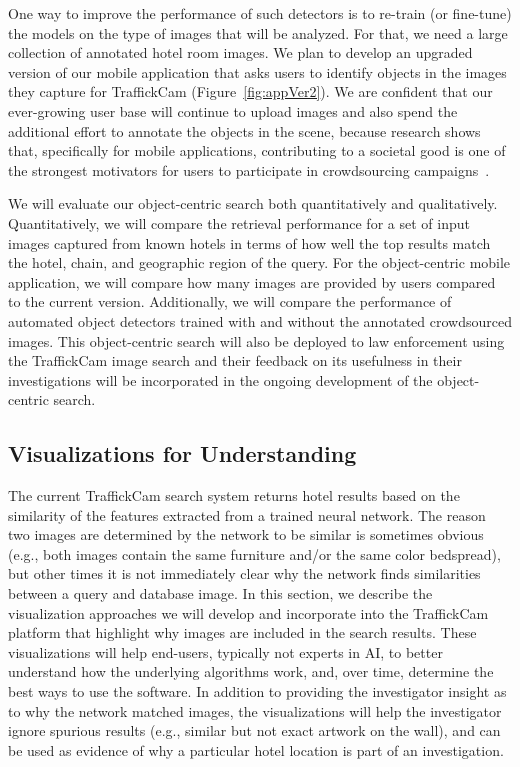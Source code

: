 \documentclass[12pt]{article}
\begin{document}
One way to improve the performance of such detectors is to re-train (or fine-tune) the models on the type of images that will be analyzed. For that, we need a large collection of annotated hotel room images. We plan to develop an upgraded version of our mobile application that asks users to identify objects in the images they capture for TraffickCam (Figure~\ref{fig:appVer2}). We are confident that our ever-growing user base will continue to upload images and also spend the additional effort to annotate the objects in the scene, because research shows that, specifically for mobile applications, contributing to a societal good is one of the strongest motivators for users to participate in crowdsourcing campaigns~\cite{DBLP:journals/tosn/RestucciaDP16}.

We will evaluate our object-centric search both quantitatively and qualitatively. Quantitatively, we will compare the retrieval performance for a set of input images captured from known hotels in terms of how well the top results match the hotel, chain, and geographic region of the query. For the object-centric mobile application, we will compare how many images are provided by users compared to the current version. Additionally, we will compare the performance of automated object detectors trained with and without the annotated crowdsourced images. This object-centric search will also be deployed to law enforcement using the TraffickCam image search and their feedback on its usefulness in their investigations will be incorporated in the ongoing development of the object-centric search.

\subsection{Visualizations for Understanding}
\label{sec:viz}
The current TraffickCam search system returns hotel results based on the similarity of the features extracted from a trained neural network. The reason two images are determined by the network to be similar is sometimes obvious (e.g., both images contain the same furniture and/or the same color bedspread), but other times it is not immediately clear why the network finds similarities between a query and database image. In this section, we describe the visualization approaches we will develop and incorporate into the TraffickCam platform that highlight why images are included in the search results. These visualizations will help end-users, typically not experts in AI, to better understand how the underlying algorithms work, and, over time, determine the best ways to use the software. In addition to providing the investigator insight as to why the network matched images, the visualizations will help the investigator ignore spurious results (e.g., similar but not exact artwork on the wall), and can be used as evidence of why a particular hotel location is part of an investigation.
\end{document}
